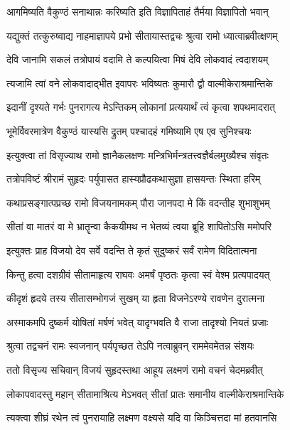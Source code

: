 \twolineshloka
{आगमिष्यति वैकुण्ठं सनाथान्नः करिष्यति}
{इति विज्ञापिताहं तैर्मया विज्ञापितो भवान्} %

\twolineshloka
{यद्युक्तं तत्कुरुष्वाद्य नाहमाज्ञापये प्रभो}
{सीतायास्तद्वचः श्रुत्वा रामो ध्यात्वाब्रवीत्क्षणम्} %

\twolineshloka
{देवि जानामि सकलं तत्रोपायं वदामि ते}
{कल्पयित्वा मिषं देवि लोकवादं त्वदाशयम्} %

\twolineshloka
{त्यजामि त्वां वने लोकवादाद्भीत इवापरः}
{भविष्यतः कुमारौ द्वौ वाल्मीकेराश्रमान्तिके} %

\twolineshloka
{इदानीं दृश्यते गर्भः पुनरागत्य मेऽन्तिकम्}
{लोकानां प्रत्ययार्थं त्वं कृत्वा शपथमादरात्} %

\twolineshloka
{भूमेर्विवरमात्रेण वैकुण्ठं यास्यसि द्रुतम्}
{पश्चादहं गमिष्यामि एष एव सुनिश्चयः} %

\twolineshloka
{इत्युक्त्वा तां विसृज्याथ रामो ज्ञानैकलक्षणः}
{मन्त्रिभिर्मन्त्रतत्त्वज्ञैर्बलमुख्यैश्च संवृतः} %

\twolineshloka
{तत्रोपविष्टं श्रीरामं सुहृदः पर्युपासत}
{हास्यप्रौढकथासुज्ञा हासयन्तः स्थिता हरिम्} %

\twolineshloka
{कथाप्रसङ्गात्पप्रच्छ रामो विजयनामकम्}
{पौरा जानपदा मे किं वदन्तीह शुभाशुभम्} %

\twolineshloka
{सीतां वा मातरं वा मे भ्रातॄन्वा कैकयीमथ}
{न भेतव्यं त्वया ब्रूहि शापितोऽसि ममोपरि} %

\twolineshloka
{इत्युक्तः प्राह विजयो देव सर्वे वदन्ति ते}
{कृतं सुदुष्करं सर्वं रामेण विदितात्मना} %

\twolineshloka
{किन्तु हत्वा दशग्रीवं सीतामाहृत्य राघवः}
{अमर्षं पृष्ठतः कृत्वा स्वं वेश्म प्रत्यपादयत्} %

\twolineshloka
{कीदृशं हृदये तस्य सीतासम्भोगजं सुखम्}
{या हृता विजनेऽरण्ये रावणेन दुरात्मना} %

\twolineshloka
{अस्माकमपि दुष्कर्म योषितां मर्षणं भवेत्}
{यादृग्भवति वै राजा तादृश्यो नियतं प्रजाः} %

\twolineshloka
{श्रुत्वा तद्वचनं रामः स्वजनान् पर्यपृच्छत}
{तेऽपि नत्वाब्रुवन् राममेवमेतन्न संशयः} %

\twolineshloka
{ततो विसृज्य सचिवान् विजयं सुहृदस्तथा}
{आहूय लक्ष्मणं रामो वचनं चेदमब्रवीत्} %

\twolineshloka
{लोकापवादस्तु महान् सीतामाश्रित्य मेऽभवत्}
{सीतां प्रातः समानीय वाल्मीकेराश्रमान्तिके} %

\twolineshloka
{त्यक्त्वा शीघ्रं रथेन त्वं पुनरायाहि लक्ष्मण}
{वक्ष्यसे यदि वा किञ्चित्तदा मां हतवानसि} %

